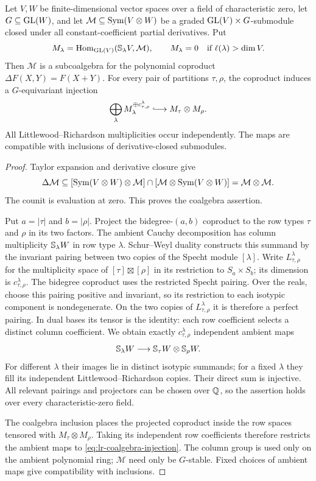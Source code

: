 \begin{theorem}
\label{thm:derivative-coalgebra}
Let $V,W$ be finite-dimensional vector spaces over a field of
characteristic zero, let $G\subseteq\operatorname{GL}(W)$, and let
$\mathcal M\subseteq\operatorname{Sym}(V\otimes W)$ be a graded
$\operatorname{GL}(V)\times G$-submodule closed under all constant-coefficient
partial derivatives. Put
\[
 M_\lambda=\operatorname{Hom}_{\operatorname{GL}(V)}(\mathbb S_\lambda V,\mathcal M),
 \qquad M_\lambda=0\quad\text{if }\ell(\lambda)>\dim V.
\]
Then $\mathcal M$ is a subcoalgebra for the polynomial coproduct
$\Delta F(X,Y)=F(X+Y)$. For every pair of partitions $\tau,\rho$,
the coproduct induces a $G$-equivariant injection
\begin{equation}\label{eq:lr-coalgebra-injection}
 \bigoplus_\lambda M_\lambda^{\oplus c_{\tau,\rho}^{\lambda}}
       \lhook\joinrel\longrightarrow M_\tau\otimes M_\rho.
\end{equation}
All Littlewood--Richardson multiplicities occur independently.
The maps are compatible with inclusions of derivative-closed submodules.
\end{theorem}
\begin{proof}
Taylor expansion and derivative closure give
\[
 \Delta\mathcal M\subseteq
 [\operatorname{Sym}(V\otimes W)\otimes\mathcal M]
 \cap[\mathcal M\otimes\operatorname{Sym}(V\otimes W)]
 =\mathcal M\otimes\mathcal M.
\]
The counit is evaluation at zero. This proves the coalgebra assertion.

Put $a=|\tau|$ and $b=|\rho|$. Project the bidegree-$(a,b)$
coproduct to the row types $\tau$ and $\rho$ in its two factors.
The ambient Cauchy decomposition has column multiplicity
$\mathbb S_\lambda W$ in row type $\lambda$. Schur--Weyl duality
constructs this summand by the invariant pairing between two copies
of the Specht module $[\lambda]$.  Write
$L_{\tau,\rho}^{\lambda}$ for the multiplicity space of
$[\tau]\boxtimes[\rho]$ in its restriction to $S_a\times S_b$;
its dimension is $c_{\tau,\rho}^{\lambda}$.
The bidegree coproduct uses the restricted Specht pairing.
Over the reals, choose this pairing positive and invariant, so
its restriction to each isotypic component is nondegenerate.
On the two copies of $L_{\tau,\rho}^{\lambda}$ it is therefore a
perfect pairing.  In dual bases its tensor is the identity:
each row coefficient selects a distinct column coefficient.
We obtain exactly $c_{\tau,\rho}^{\lambda}$ independent ambient maps
\[
 \mathbb S_\lambda W\longrightarrow
                  \mathbb S_\tau W\otimes\mathbb S_\rho W.
\]
For different $\lambda$ their images lie in distinct isotypic
summands; for a fixed $\lambda$ they fill its independent
Littlewood--Richardson copies. Their direct sum is injective.
All relevant pairings and projectors can be chosen over $\mathbb Q$,
so the assertion holds over every characteristic-zero field.

The coalgebra inclusion places the projected coproduct inside
the row spaces tensored with $M_\tau\otimes M_\rho$. Taking its
independent row coefficients therefore restricts the ambient maps
to \eqref{eq:lr-coalgebra-injection}. The column group is used
only on the ambient polynomial ring; $\mathcal M$ need only be
$G$-stable. Fixed choices of ambient maps give compatibility
with inclusions.
\end{proof}


